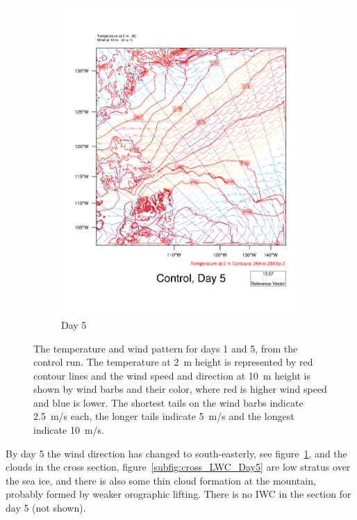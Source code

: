 \begin{figure}
\begin{subfigure}{0.48\textwidth}
        \includegraphics[width=\textwidth]{results/T2UV10_Control_Day5.pdf}
        \caption{Day 5}
        \label{subfig:weather_cont_day5}
    \end{subfigure}
    \caption{The temperature and wind pattern for days 1 and 5, from the control run. The temperature at 2~m height is represented by red contour lines and the wind speed and direction at 10~m height is shown by wind barbs and their color, where red is higher wind speed and blue is lower. The shortest tails on the wind barbs indicate 2.5~m/s each, the longer tails indicate 5~m/s and the longest indicate 10~m/s.}
    \label{fig:weather}
\end{figure}

By day 5 the wind direction has changed to south-easterly, see figure~\ref{subfig:weather_cont_day5}, and the clouds in the cross section, figure~\ref{subfig:cross_LWC_Day5} are low stratus over the sea ice, and there is also some thin cloud formation at the mountain, probably formed by weaker orographic lifting. There is no IWC in the section for day 5 (not shown).

